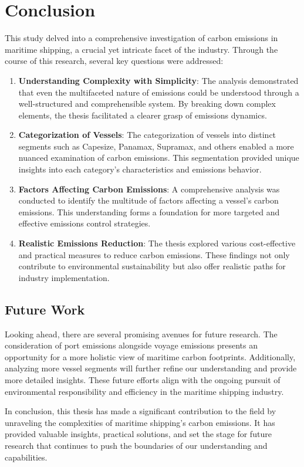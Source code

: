 \chapter{Conclusion}

This study delved into a comprehensive investigation of carbon emissions in maritime shipping, a crucial yet intricate facet of the industry. Through the course of this research, several key questions were addressed:

\begin{enumerate}
    \item \textbf{Understanding Complexity with Simplicity}: The analysis demonstrated that even the multifaceted nature of emissions could be understood through a well-structured and comprehensible system. By breaking down complex elements, the thesis facilitated a clearer grasp of emissions dynamics.
    \item \textbf{Categorization of Vessels}: The categorization of vessels into distinct segments such as Capesize, Panamax, Supramax, and others enabled a more nuanced examination of carbon emissions. This segmentation provided unique insights into each category's characteristics and emissions behavior.
    \item \textbf{Factors Affecting Carbon Emissions}: A comprehensive analysis was conducted to identify the multitude of factors affecting a vessel's carbon emissions. This understanding forms a foundation for more targeted and effective emissions control strategies.
    \item \textbf{Realistic Emissions Reduction}: The thesis explored various cost-effective and practical measures to reduce carbon emissions. These findings not only contribute to environmental sustainability but also offer realistic paths for industry implementation.
\end{enumerate}

\section{Future Work}

Looking ahead, there are several promising avenues for future research. The consideration of port emissions alongside voyage emissions presents an opportunity for a more holistic view of maritime carbon footprints. Additionally, analyzing more vessel segments will further refine our understanding and provide more detailed insights. These future efforts align with the ongoing pursuit of environmental responsibility and efficiency in the maritime shipping industry.

In conclusion, this thesis has made a significant contribution to the field by unraveling the complexities of maritime shipping's carbon emissions. It has provided valuable insights, practical solutions, and set the stage for future research that continues to push the boundaries of our understanding and capabilities.
